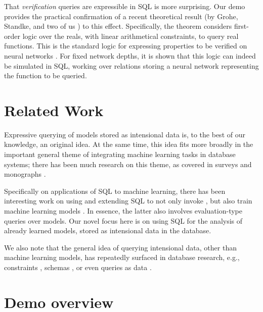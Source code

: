 \documentclass{article}
\begin{document}
That \emph{verification} queries are expressible in SQL is more
surprising.  Our demo provides the practical confirmation of a
recent theoretical result (by Grohe, Standke, and two of us
\cite{ql4nn}) to this effect.  Specifically, the theorem
considers first-order logic over the reals, with linear
arithmetical constraints, to query real functions.  This is the
standard logic for expressing properties to be verified on
neural networks \cite{aws-book}.  For fixed network depths,
it is shown that this logic
can indeed be simulated in SQL, working over relations storing a
neural network representing the function to be queried.


\section{Related Work} \label{secrel}

Expressive querying of models stored as intensional data is, to
the best of our knowledge, an original idea.  At the same time,
this idea fits more broadly in the important general theme of
integrating machine learning tasks in database systems; there has
been much research on this theme, as covered in surveys and
monographs \cite{boehmbook,declarmlsurvey,ss-m-ml-lifecycle-survey}.

Specifically on applications of SQL to machine learning, there
has been interesting work on using and extending SQL to not only
invoke \cite{madlib}, but also train machine learning models
\cite{jermaine_linalgebra,ml2sql,sql4ml}.  In essence, the
latter also involves evaluation-type queries over models.
Our novel focus here is on using SQL for the analysis of
already learned models, stored as intensional data in the
database.

We also note that the general idea of querying 
intensional data, other than machine
learning models, has repeatedly surfaced in database research,
e.g., constraints \cite{kkr_cql}, schemas \cite{schemasql2},
or even queries as data \cite{stoneb_queldatatype,metasql}.

\section{Demo overview}

\smallskip
\end{document}
